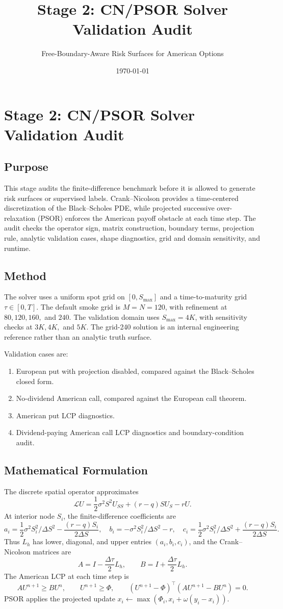 \documentclass[11pt]{article}
\title{Stage 2: CN/PSOR Solver Validation Audit}
\author{Free-Boundary-Aware Risk Surfaces for American Options}
\date{\today}
\begin{document}
\maketitle

\section{Stage 2: CN/PSOR Solver Validation Audit}

\subsection{Purpose}
This stage audits the finite-difference benchmark before it is allowed to
generate risk surfaces or supervised labels. Crank--Nicolson provides a
time-centered discretization of the Black--Scholes PDE, while projected
successive over-relaxation (PSOR) enforces the American payoff obstacle at each
time step. The audit checks the operator sign, matrix construction, boundary
terms, projection rule, analytic validation cases, shape diagnostics, grid and
domain sensitivity, and runtime.

\subsection{Method}
The solver uses a uniform spot grid on \([0,S_{\max}]\) and a
time-to-maturity grid \(\tau\in[0,T]\). The default smoke grid is \(M=N=120\),
with refinement at \(80,120,160,\) and \(240\). The validation domain uses
\(S_{\max}=4K\), with sensitivity checks at \(3K,4K,\) and \(5K\). The
grid-240 solution is an internal engineering reference rather than an analytic
truth surface.

Validation cases are:
\begin{enumerate}
  \item European put with projection disabled, compared against the Black--Scholes closed form.
  \item No-dividend American call, compared against the European call theorem.
  \item American put LCP diagnostics.
  \item Dividend-paying American call LCP diagnostics and boundary-condition audit.
\end{enumerate}

\subsection{Mathematical Formulation}
The discrete spatial operator approximates
\[
\mathcal{L}U=\frac{1}{2}\sigma^2S^2U_{SS}+(r-q)SU_S-rU.
\]
At interior node $S_i$, the finite-difference coefficients are
\[
a_i=\frac{1}{2}\sigma^2S_i^2/\Delta S^2-\frac{(r-q)S_i}{2\Delta S},
\quad
b_i=-\sigma^2S_i^2/\Delta S^2-r,
\quad
c_i=\frac{1}{2}\sigma^2S_i^2/\Delta S^2+\frac{(r-q)S_i}{2\Delta S}.
\]
Thus $L_h$ has lower, diagonal, and upper entries $(a_i,b_i,c_i)$, and the Crank--Nicolson matrices are
\[
A=I-\frac{\Delta\tau}{2}L_h,\qquad B=I+\frac{\Delta\tau}{2}L_h.
\]
The American LCP at each time step is
\[
AU^{n+1}\ge B U^n,\qquad U^{n+1}\ge \Phi,\qquad
(U^{n+1}-\Phi)^\top(AU^{n+1}-BU^n)=0.
\]
PSOR applies the projected update $x_i\leftarrow\max(\Phi_i,x_i+\omega(y_i-x_i))$.
\end{document}
